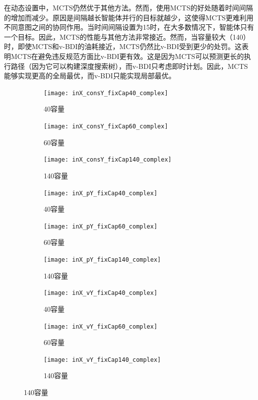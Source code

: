 在动态设置中，MCTS仍然优于其他方法。然而，使用MCTS的好处随着时间间隔的增加而减少。原因是间隔越长智能体并行的目标就越少，这使得MCTS更难利用不同意图之间的协同作用。当时间间隔设置为15时，在大多数情况下，智能体只有一个目标。因此，MCTS的性能与其他方法非常接近。然而，当容量较大（140）时，即使MCTS和v-BDI的油耗接近，MCTS仍然比v-BDI受到更少的处罚。这表明MCTS在避免违反规范方面比v-BDI更有效。这是因为MCTS可以预测更长的执行路径（因为它可以构建深度搜索树），而v-BDI只考虑即时计划。因此，MCTS能够实现更高的全局最优，而v-BDI只能实现局部最优。
\begin{figure}[H]
\centering
\begin{subfigure}{.32\textwidth}
  \centering
  \texttt{[image: inX\_consY\_fixCap40\_complex]}
  \caption{40容量}
  \captionsetup{justification=centering}
\end{subfigure}
\begin{subfigure}{.32\textwidth}
  \centering
  \texttt{[image: inX\_consY\_fixCap60\_complex]}
  \caption{60容量}
  \captionsetup{justification=centering}
\end{subfigure}
\begin{subfigure}{.32\textwidth}
  \centering
  \texttt{[image: inX\_consY\_fixCap140\_complex]}
  \caption{140容量}
  \captionsetup{justification=centering}
\end{subfigure}
\begin{subfigure}{.32\textwidth}
  \centering
  \texttt{[image: inX\_pY\_fixCap40\_complex]}
  \caption{40容量}
  \captionsetup{justification=centering}
\end{subfigure}
\begin{subfigure}{.32\textwidth}
  \centering
  \texttt{[image: inX\_pY\_fixCap60\_complex]}
  \caption{60容量}
  \captionsetup{justification=centering}
\end{subfigure}
\begin{subfigure}{.32\textwidth}
  \centering
  \texttt{[image: inX\_pY\_fixCap140\_complex]}
  \caption{140容量}
  \captionsetup{justification=centering}
\end{subfigure}
\begin{subfigure}{.32\textwidth}
  \centering
  \texttt{[image: inX\_vY\_fixCap40\_complex]}
  \caption{40容量}
  \captionsetup{justification=centering}
\end{subfigure}
\begin{subfigure}{.32\textwidth}
  \centering
  \texttt{[image: inX\_vY\_fixCap60\_complex]}
  \caption{60容量}
  \captionsetup{justification=centering}
\end{subfigure}
\begin{subfigure}{.32\textwidth}
  \centering
  \texttt{[image: inX\_vY\_fixCap140\_complex]}
  \caption{140容量}
  \captionsetup{justification=centering}
\end{subfigure}
\captionsetup{justification=centering}
\label{fig:static_complex}
\end{figure}


